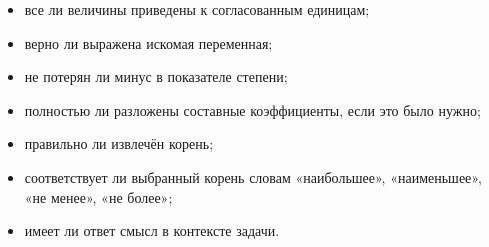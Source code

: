\documentclass[a4paper,12pt]{article}
\begin{document}
\begin{itemize}
    \item все ли величины приведены к согласованным единицам;
    \item верно ли выражена искомая переменная;
    \item не потерян ли минус в показателе степени;
    \item полностью ли разложены составные коэффициенты, если это было нужно;
    \item правильно ли извлечён корень;
    \item соответствует ли выбранный корень словам
    «наибольшее», «наименьшее», «не менее», «не более»;
    \item имеет ли ответ смысл в контексте задачи.
\end{itemize}
\end{document}
